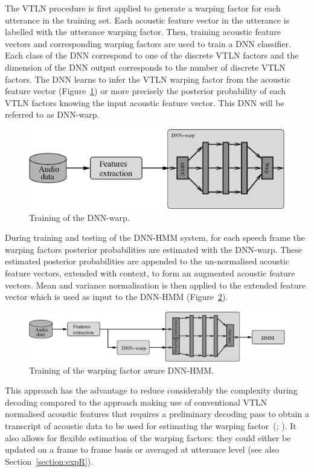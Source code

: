 \documentclass{nle}
\begin{document}
The VTLN procedure is first applied to generate a warping factor for
each  utterance in the  training set. Each acoustic feature vector in the utterance is labelled with the utterance warping factor. Then, training acoustic feature vectors and corresponding warping factors are used to train a DNN classifier. Each class of the DNN correspond to one of the discrete VTLN factors and the dimension of the DNN output corresponds to the number of discrete VTLN factors. The DNN learns to infer the VTLN warping factor from the acoustic feature vector (Figure~\ref{fig1}) or more precisely the posterior probability of each VTLN factors knowing the input acoustic feature vector. This DNN will be referred to as DNN-warp.
\begin{figure}
       \includegraphics[width=\textwidth]{fig1}
        \caption{Training of the DNN-warp.} 
   	\label{fig1}
\end{figure}


During training  and testing  of the DNN-HMM  system, for  each speech
frame the  warping factors posterior probabilities are  estimated with
the DNN-warp. These estimated posterior probabilities are appended to
the un-normalised acoustic feature vectors, extended  with context, to
form an augmented acoustic feature vectors. Mean and variance normalisation is then applied to the extended feature vector
which is used as input to the DNN-HMM (Figure~\ref{fig2}).
 \begin{figure}
       \includegraphics[width=\textwidth]{fig2}
         \caption{Training of the warping factor aware DNN-HMM.} 
    	\label{fig2}
 \end{figure}
 
This approach has the  advantage to reduce considerably the complexity
during decoding  compared to the  approach making use  of conventional
VTLN normalised acoustic features that requires a preliminary decoding
pass to obtain a transcript of acoustic data to be used for estimating
the   warping   factor~(\citealp{LeeRos96}; \citealp*{WelKanNey99}). 
It also allows for flexible estimation of the
warping  factors: they could  either be  updated on  a frame  to frame
basis     or    averaged    at     utterance    level     (see    also
Section~\ref{section:expR}).
\end{document}
